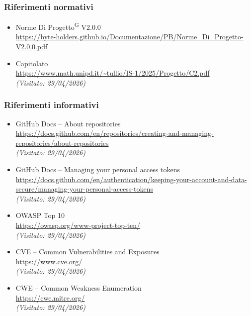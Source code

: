 \documentclass[a4paper, 11pt]{article}
\newcommand{\lastVisited}[3]{\textit{(Visitato: #1/#2/#3)}}
\begin{document}
\subsubsection{Riferimenti normativi}
\begin{itemize}
  \item
    Norme Di Progetto\textsuperscript{G} V2.0.0\\
    \url{https://byte-holders.github.io/Documentazione/PB/Norme_Di_Progetto-V2.0.0.pdf}
  \item
    Capitolato\\
    \url{https://www.math.unipd.it/~tullio/IS-1/2025/Progetto/C2.pdf}\\
    \lastVisited{29}{04}{2026}
\end{itemize}

\subsubsection{Riferimenti informativi}
\begin{itemize}
  \item
    GitHub Docs -- About repositories\\
    \url{https://docs.github.com/en/repositories/creating-and-managing-repositories/about-repositories}\\
    \lastVisited{29}{04}{2026}
  \item
    GitHub Docs -- Managing your personal access tokens\\
    \url{https://docs.github.com/en/authentication/keeping-your-account-and-data-secure/managing-your-personal-access-tokens}\\
    \lastVisited{29}{04}{2026}
  \item
    OWASP Top 10\\
    \url{https://owasp.org/www-project-top-ten/}\\
    \lastVisited{29}{04}{2026}
  \item
  	CVE -- Common Vulnerabilities and Exposures\\
  	\url{https://www.cve.org/}\\
  	\lastVisited{29}{04}{2026}
  \item
    CWE -- Common Weakness Enumeration\\
    \url{https://cwe.mitre.org/}\\
    \lastVisited{29}{04}{2026}
\end{itemize}

\newpage
\end{document}
